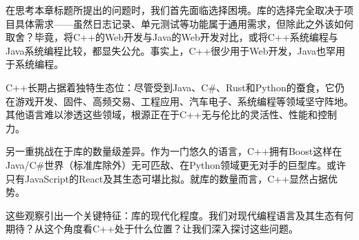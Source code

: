 在思考本章标题所提出的问题时，我们首先面临选择困境。库的选择完全取决于项目具体需求——虽然日志记录、单元测试等功能属于通用需求，但除此之外该如何取舍？毕竟，将C++的Web开发与Java的Web开发对比，或将C++系统编程与Java系统编程比较，都显失公允。事实上，C++很少用于Web开发，Java也罕用于系统编程。

C++长期占据着独特生态位：尽管受到Java、C\#、Rust和Python的蚕食，它仍在游戏开发、固件、高频交易、工程应用、汽车电子、系统编程等领域坚守阵地。其他语言难以渗透这些领域，根源正在于C++无与伦比的灵活性、性能和控制力。

另一重挑战在于库的数量级差异。作为一门悠久的语言，C++拥有Boost这样在Java/C\#世界（标准库除外）无可匹敌、在Python领域更无对手的巨型库。或许只有JavaScript的React及其生态可堪比拟。就库的数量而言，C++显然占据优势。

这些观察引出一个关键特征：库的现代化程度。我们对现代编程语言及其生态有何期待？从这个角度看C++处于什么位置？让我们深入探讨这些问题。